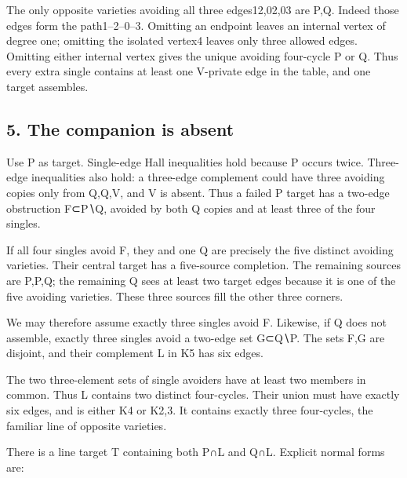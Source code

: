 \documentclass[
  10pt,
]{article}
\begin{document}
The only opposite varieties avoiding all three edges12,02,03 are P,Q.
Indeed those edges form the path1--2--0--3. Omitting an endpoint leaves
an internal vertex of degree one; omitting the isolated vertex4 leaves
only three allowed edges. Omitting either internal vertex gives the
unique avoiding four-cycle P or Q. Thus every extra single contains at
least one V-private edge in the table, and one target assembles.

\hypertarget{the-companion-is-absent}{%
\subsection*{5. The companion is absent}\label{the-companion-is-absent}}

Use P as target. Single-edge Hall inequalities hold because P occurs
twice. Three-edge inequalities also hold: a three-edge complement could
have three avoiding copies only from Q,Q,V, and V is absent. Thus a
failed P target has a two-edge obstruction F⊂P∖Q, avoided by both Q
copies and at least three of the four singles.

If all four singles avoid F, they and one Q are precisely the five
distinct avoiding varieties. Their central target has a five-source
completion. The remaining sources are P,P,Q; the remaining Q sees at
least two target edges because it is one of the five avoiding varieties.
These three sources fill the other three corners.

We may therefore assume exactly three singles avoid F. Likewise, if Q
does not assemble, exactly three singles avoid a two-edge set G⊂Q∖P. The
sets F,G are disjoint, and their complement L in K5 has six edges.

The two three-element sets of single avoiders have at least two members
in common. Thus L contains two distinct four-cycles. Their union must
have exactly six edges, and is either K4 or K2,3. It contains exactly
three four-cycles, the familiar line of opposite varieties.

There is a line target T containing both P∩L and Q∩L. Explicit normal
forms are:
\end{document}
